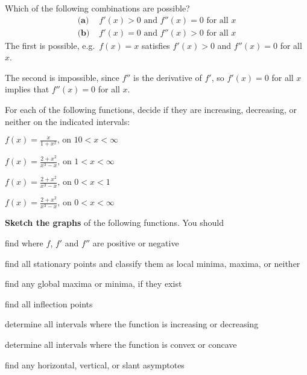 \begin{multicols}{2}
\problem \groupproblem Which of the following combinations are possible? %
\begin{align*}
  \textbf{(a)~}& f'(x)>0 \text{ and } f''(x)=0 \text{ for all } x \\
  \textbf{(b)~}& f'(x)=0 \text{ and } f''(x)>0 \text{ for all } x
\end{align*}
\answer %
The first is possible, e.g.~$f(x) = x$ satisfies $f'(x)>0$ and
$f''(x)=0$ for all $x$.

The second is impossible, since $f''$ is the derivative of
$f'$, so $f'(x) = 0$ for all $x$ implies that
$f''(x)=0$ for all $x$.
\endanswer








\bigskip




For each of the following functions, decide if they are
increasing, decreasing, or neither on the indicated intervals:

\problem $\displaystyle f(x) = \frac{x}{1+x^2} \text{, on }  10<x<\infty$ %

\problem $\displaystyle f(x) = \frac{2+x^2}{x^3-x} \text{, on }  1<x<\infty$ %

\problem $\displaystyle f(x) = \frac{2+x^2}{x^3-x} \text{, on }  0<x<1$ %

\problem $\displaystyle f(x) = \frac{2+x^2}{x^3-x} \text{, on }  0<x<\infty$ %

\bigskip

\textbf{Sketch the graphs} of the following functions.
You should
\begin{list}{--}{
    \setlength{\itemindent}{0pt}
    \setlength{\leftmargin}{6pt}}
\item find where $f$, $f'$ and $f''$ are positive or negative
\item find all stationary points and classify them as local minima, maxima, or neither
\item find any global maxima or minima, if they exist
\item find all inflection points
\item determine all intervals where the function is increasing or decreasing
\item determine all intervals where the function is convex or concave
\item find any horizontal, vertical, or slant asymptotes
\end{list}

















\end{multicols}
